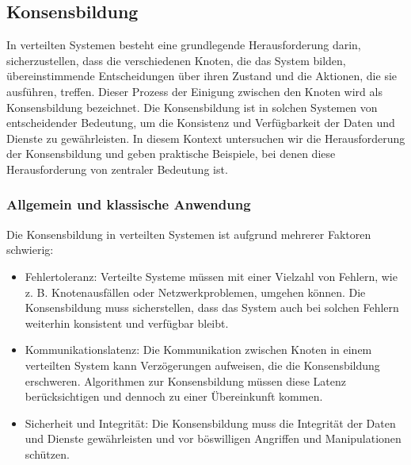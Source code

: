 \subsection{Konsensbildung}

In verteilten Systemen besteht eine grundlegende Herausforderung darin, sicherzustellen, dass die verschiedenen Knoten, die das System bilden, übereinstimmende Entscheidungen über ihren Zustand und die Aktionen, die sie ausführen, treffen. Dieser Prozess der Einigung zwischen den Knoten wird als Konsensbildung bezeichnet. Die Konsensbildung ist in solchen Systemen von entscheidender Bedeutung, um die Konsistenz und Verfügbarkeit der Daten und Dienste zu gewährleisten. In diesem Kontext untersuchen wir die Herausforderung der Konsensbildung und geben praktische Beispiele, bei denen diese Herausforderung von zentraler Bedeutung ist.
\subsubsection{Allgemein und klassische Anwendung}
Die Konsensbildung in verteilten Systemen ist aufgrund mehrerer Faktoren schwierig:
\begin{itemize}
\item  Fehlertoleranz: Verteilte Systeme müssen mit einer Vielzahl von Fehlern, wie z. B. Knotenausfällen oder Netzwerkproblemen, umgehen können. Die Konsensbildung muss sicherstellen, dass das System auch bei solchen Fehlern weiterhin konsistent und verfügbar bleibt.

\item Kommunikationslatenz: Die Kommunikation zwischen Knoten in einem verteilten System kann Verzögerungen aufweisen, die die Konsensbildung erschweren. Algorithmen zur Konsensbildung müssen diese Latenz berücksichtigen und dennoch zu einer Übereinkunft kommen.

\item  Sicherheit und Integrität: Die Konsensbildung muss die Integrität der Daten und Dienste gewährleisten und vor böswilligen Angriffen und Manipulationen schützen.
\end{itemize}

